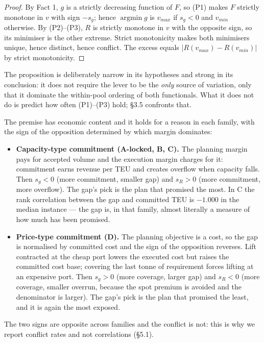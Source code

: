 \documentclass[preprint,12pt,letterpaper]{elsarticle}
\theoremstyle{definition}
\theoremstyle{plain}
\begin{document}
\begin{proof}
By Fact 1, $g$ is a strictly decreasing function of $F$, so (P1) makes $F$ strictly monotone in $v$ with sign $-s_{g}$; hence $\operatorname{argmin} g$ is $v_{max}$ if $s_{g} < 0$ and $v_{min}$ otherwise. By (P2)--(P3), $R$ is strictly monotone in $v$ with the opposite sign, so its minimiser is the other extreme. Strict monotonicity makes both minimisers unique, hence distinct, hence conflict. The excess equals $|R(v_{max}) - R(v_{min})|$ by strict monotonicity.
\end{proof}

The proposition is deliberately narrow in its hypotheses and strong in its conclusion: it does not require the lever to be the \textit{only} source of variation, only that it dominate the within-pool ordering of both functionals. What it does not do is predict how often (P1)--(P3) hold; \S 3.5 confronts that.

The premise has economic content and it holds for a reason in each family, with the sign of the opposition determined by which margin dominates:

\begin{itemize}
\item \textbf{Capacity-type commitment (A-locked, B, C).} The planning margin pays for accepted volume and the execution margin charges for it: commitment earns revenue per TEU and creates overflow when capacity falls. Then $s_{g} < 0$ (more commitment, smaller gap) and $s_{R} > 0$ (more commitment, more overflow). The gap's pick is the plan that promised the most. In C the rank correlation between the gap and committed TEU is $-1.000$ in the median instance --- the gap is, in that family, almost literally a measure of how much has been promised.
\item \textbf{Price-type commitment (D).} The planning objective is a cost, so the gap is normalised by committed cost and the sign of the opposition reverses. Lift contracted at the cheap port lowers the executed cost but raises the committed cost base; covering the last tonne of requirement forces lifting at an expensive port. Then $s_{g} > 0$ (more coverage, larger gap) and $s_{R} < 0$ (more coverage, smaller overrun, because the spot premium is avoided and the denominator is larger). The gap's pick is the plan that promised the least, and it is again the most exposed.
\end{itemize}

The two signs are opposite across families and the conflict is not: this is why we report conflict rates and not correlations (\S 5.1).
\end{document}
